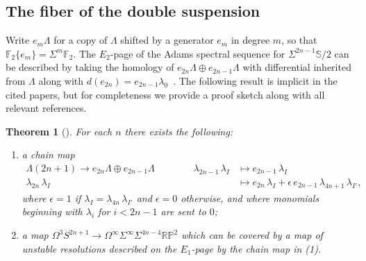 \documentclass[dvipsnames,table]{amsart}
\newtheorem{theorem}{Theorem}[section]
\theoremstyle{definition}
\theoremstyle{remark}
\numberwithin{equation}{section}
\begin{document}
\subsection{The fiber of the double suspension}
Write $e_m \Lambda$ for a copy of $\Lambda$ shifted by a generator $e_m$ in degree $m$, so that $\mathbb{F}_2\{e_m\} = \Sigma^m \mathbb{F}_2$. The $E_2$-page of the Adams spectral sequence for $\Sigma^{2n - 1}\mathbb{S}/2$
can be described by taking the homology of $e_{2n} \Lambda \oplus e_{2n -
  1} \Lambda $ with differential inherited from $\Lambda$ along with $d(e_{2n}) = e_{2n - 1} \lambda_0$~\cite{Priddy_1970}. The following result is implicit in the cited papers, but for completeness we provide a proof sketch along with all relevant references.
\begin{theorem}[\cite{Mahowald_1975, Mahowald_1982, Mahowald_Thompson_1994}]
\label{thm:mah}
For each $n$ there exists the following:
\begin{enumerate}
\item a chain map
\begin{equation*}
\begin{aligned}
  \Lambda(2n + 1) \to e_{2n} \Lambda \oplus e_{2n - 1} \Lambda \qquad\qquad
  \lambda_{2n - 1}\,\lambda_I &\mapsto e_{2n - 1}\,\lambda_I \\
  \lambda_{2n}\,\lambda_I &\mapsto e_{2n}\,\lambda_I + \epsilon\, e_{2n - 1}\,\lambda_{4n + 1}\,\lambda_{I'},
\end{aligned}
\end{equation*}
where $\epsilon = 1$ if $\lambda_I = \lambda_{4n}\,\lambda_{I'}$ and $\epsilon = 0$ otherwise, and where monomials beginning with $\lambda_i$ for $i < 2n - 1$ are sent to $0$;
\item a map $\Omega^{3} S^{2n + 1} \to \Omega^{\infty}\Sigma^{\infty}\Sigma^{4n - 4}\mathbb{RP}^2$ which can be covered by a map of unstable resolutions described on the $E_1$-page by the chain map in (1).
\end{enumerate}
\end{theorem}
\end{document}
